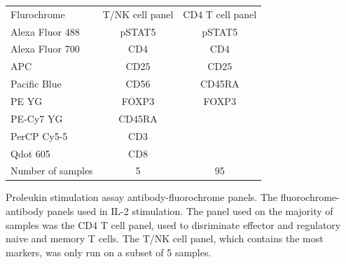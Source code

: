 \begin{table}[h!]\footnotesize
\centering
\begin{tabularx}{.6\textwidth}{lcc}
\rowcolor{Gray}
Flurochrome       & T/NK cell panel & CD4 T cell panel   \\
Alexa Fluor 488   & pSTAT5          & pSTAT5             \\
Alexa Fluor 700   & CD4             & CD4                \\
APC               & CD25            & CD25               \\
Pacific Blue      & CD56            & CD45RA             \\
PE YG             & FOXP3           & FOXP3              \\
PE-Cy7 YG         & CD45RA          &                    \\
PerCP Cy5-5       & CD3             &                    \\
Qdot 605          & CD8             &                    \\
\hline
Number of samples &  5              & 95               \\
\end{tabularx}
{Proleukin stimulation assay antibody-fluorochrome panels.}
{
The fluorochrome-antibody panels used in IL-2 stimulation.
The panel used on the majority of samples was the CD4 T cell panel, used to disriminate
effector and regulatory naive and memory T cells.
The T/NK cell panel, which contains the most markers, was only run on a subset of 5 samples.
}
\end{table}

